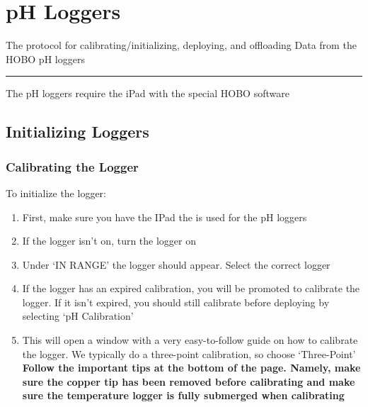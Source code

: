 \documentclass[
  letterpaper,
  DIV=11,
  numbers=noendperiod]{scrreprt}
\begin{document}
\hypertarget{ph-loggers}{%
\chapter{pH Loggers}\label{ph-loggers}}

The protocol for calibrating/initializing, deploying, and offloading
Data from the HOBO pH loggers

\begin{center}\rule{0.5\linewidth}{0.5pt}\end{center}

The pH loggers require the iPad with the special HOBO software

\hypertarget{initializing-loggers-1}{%
\section*{\texorpdfstring{\textbf{Initializing
Loggers}}{Initializing Loggers}}\label{initializing-loggers-1}}


\hypertarget{calibrating-the-logger}{%
\subsection*{\texorpdfstring{\textbf{Calibrating the
Logger}}{Calibrating the Logger}}\label{calibrating-the-logger}}

To initialize the logger:

\begin{enumerate}
\def\labelenumi{\arabic{enumi}.}
\item
  First, make sure you have the IPad the is used for the pH loggers
\item
  If the logger isn't on, turn the logger on
\item
  Under `IN RANGE' the logger should appear. Select the correct logger
\item
  If the logger has an expired calibration, you will be promoted to
  calibrate the logger. If it isn't expired, you should still calibrate
  before deploying by selecting `pH Calibration'
\item
  This will open a window with a very easy-to-follow guide on how to
  calibrate the logger. We typically do a three-point calibration, so
  choose `Three-Point' \textbf{Follow the important tips at the bottom
  of the page. Namely, make sure the copper tip has been removed before
  calibrating and make sure the temperature logger is fully submerged
  when calibrating}
\end{enumerate}
\end{document}
